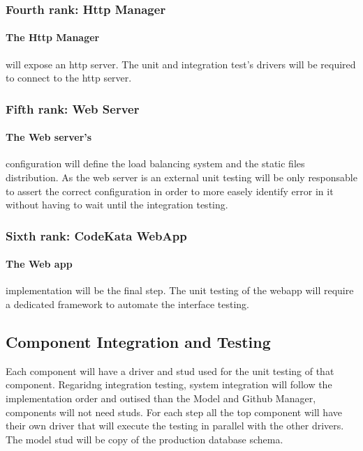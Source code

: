 \documentclass{article}
\begin{document}
\subsubsection{Fourth rank: Http Manager}
\paragraph{The Http Manager}will expose an http server. The unit and integration test's drivers will be required to connect to the http server.

\subsubsection{Fifth rank: Web Server}
\paragraph{The Web server's}configuration will define the load balancing system and the static files distribution. As the web server is an external unit testing will be only responsable to assert the correct configuration in order to more easely identify error in it without having to wait until the integration testing.

\subsubsection{Sixth rank: CodeKata WebApp}
\paragraph{The Web app}implementation will be the final step. The unit testing of the webapp will require a dedicated framework to automate the interface testing.

\subsection{Component Integration and Testing}
Each component will have a driver and stud used for the unit testing of that component.
Regaridng integration testing, system integration will follow the implementation order and outised than the Model and Github Manager, components will not need studs. For each step all the top component will have their own driver that will execute the testing in parallel with the other drivers. The model stud will be copy of the production database schema.\\\\
\end{document}
